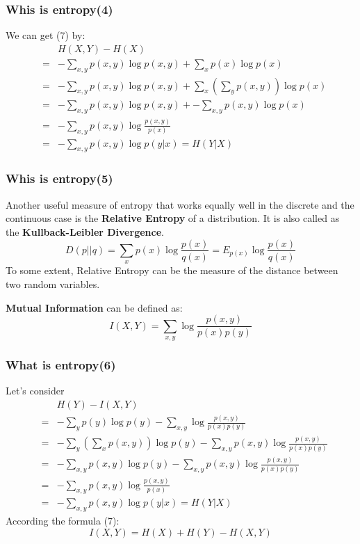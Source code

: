 \documentclass[slidestop,compress,mathserif]{beamer}
\begin{document}
	\begin{frame}[shrink]	
		\frametitle{Whis is entropy(4)}
		We can get (7) by:
		\begin{eqnarray*}
			&& H(X,Y)-H(X) \\
			&=& -\sum_{x,y}p(x,y)\log p(x,y) + \sum_x p(x)\log p(x)\\
			&=& -\sum_{x,y}p(x,y)\log p(x,y) + \sum_x\left(\sum_y p(x,y)\right)\log p(x)\\
			&=& -\sum_{x,y}p(x,y)\log p(x,y)+ -\sum_{x,y}p(x,y)\log p(x)\\
			&=& -\sum_{x,y}p(x,y)\log\frac{p(x,y)}{p(x)}\\
			&=& -\sum_{x,y} p(x,y)\log p(y|x) = H(Y|X)
		\end{eqnarray*}

	\end{frame}
	
	\begin{frame}
		\frametitle{Whis is entropy(5)}
		Another useful measure of entropy that works equally well in the discrete and the continuous case is the \textbf{Relative Entropy} of a distribution. It is also called as the \textbf{Kullback-Leibler Divergence}.
		$$D(p||q) = \sum_x p(x)\log \frac{p(x)}{q(x)} = E_{p(x)}\log\frac{p(x)}{q(x)}$$
		To some extent, Relative Entropy can be the measure of the distance between two random variables.
		
		\textbf{Mutual Information} can be defined as:
		$$I(X,Y)=\sum_{x,y}\log\frac{p(x,y)}{p(x)p(y)}$$
	\end{frame}
	
	\begin{frame}[shrink]
		\frametitle{What is entropy(6)}
		Let's consider
		\begin{eqnarray*}
			&& H(Y)-I(X,Y)  \\
			&=& -\sum_y p(y)\log p(y) - \sum_{x,y}\log\frac{p(x,y)}{p(x)p(y)} \\
			&=& -\sum_y\left(\sum_x p(x,y)\right)\log p(y) - \sum_{x,y}p(x,y)\log\frac{p(x,y)}{p(x)p(y)} \\
			&=& -\sum_{x,y}p(x,y)\log p(y) - \sum_{x,y}p(x,y)\log\frac{p(x,y)}{p(x)p(y)} \\
			&=& -\sum_{x,y}p(x,y)\log\frac{p(x,y)}{p(x)} \\
			&=& -\sum_{x,y}p(x,y)\log p(y|x) = H(Y|X)
		\end{eqnarray*}
		According the formula (7):
		$$I(X,Y) = H(X)+H(Y)-H(X,Y)$$
	\end{frame}
	
\end{document}
